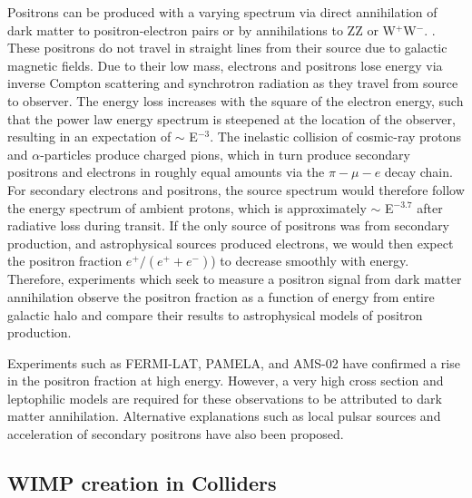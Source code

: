 \documentclass[a4paper,12pt]{article}
\begin{document}
Positrons can be produced with a varying spectrum via direct annihilation of dark matter to positron-electron pairs or by annihilations to ZZ or W$^+$W$^-$.  \cite{Cheng,Kamionkowsk}.  These positrons do not travel in straight lines from their source due to galactic magnetic fields.  Due to their low mass, electrons and positrons lose energy via inverse Compton scattering and synchrotron radiation as they travel from source to observer. The energy loss increases with the square of the electron energy, such that the power law energy spectrum is steepened at the location of the observer, resulting in an expectation of $\sim$ E$^{-3}$. \cite{PEBS}  The inelastic collision of cosmic-ray protons and $\alpha$-particles produce charged pions, which in turn produce secondary positrons and electrons in roughly equal amounts via the $\pi-\mu-e$ decay chain. \cite{Stecker}  For secondary electrons and positrons, the source spectrum would therefore follow the energy spectrum of ambient protons, which is approximately $\sim$ E$^{-3.7}$ after radiative loss during transit.  If the only source of positrons was from secondary production, and astrophysical sources produced electrons, we would then expect the positron fraction $e^+/(e^+ + e^-)$) to decrease smoothly with energy.  \cite{PEBS} Therefore, experiments which seek to measure a positron signal from dark matter annihilation observe the positron fraction as a function of energy from entire galactic halo and compare their results to astrophysical models of positron production.

Experiments such as FERMI-LAT, PAMELA, and AMS-02 have confirmed a rise in the positron fraction at high energy. \cite{FermiPositron,PamelaPositron,AMSPositron} However, a very high cross section and leptophilic models are required for these observations to be attributed to dark matter annihilation.  Alternative explanations such as local pulsar sources and acceleration of secondary positrons have also been proposed. \cite{Serpico}



\subsection{WIMP creation in Colliders}
\end{document}
